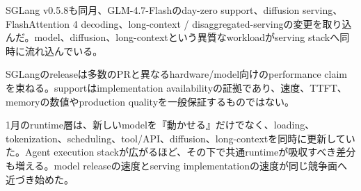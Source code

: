 SGLang v0.5.8も同月、GLM-4.7-Flashのday-zero support、diffusion serving、FlashAttention 4 decoding、long-context / disaggregated-servingの変更を取り込んだ。model、diffusion、long-contextという異質なworkloadがserving stackへ同時に流れ込んでいる。\autocite{src-6a97353d35a9}


\begin{claimboundary}
SGLangのreleaseは多数のPRと異なるhardware/model向けのperformance claimを束ねる。supportはimplementation availabilityの証拠であり、速度、TTFT、memoryの数値やproduction qualityを一般保証するものではない。\autocite{src-6a97353d35a9}
\end{claimboundary}

1月のruntime層は、新しいmodelを『動かせる』だけでなく、loading、tokenization、scheduling、tool/API、diffusion、long-contextを同時に更新していた。Agent execution stackが広がるほど、その下で共通runtimeが吸収すべき差分も増える。model releaseの速度とserving implementationの速度が同じ競争面へ近づき始めた。\autocite{src-152188dd686e,src-3bc80a3c7870,src-6a97353d35a9,src-d9f9de620203}
